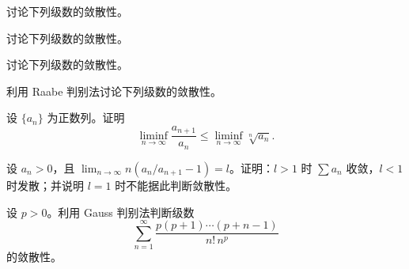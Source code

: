 \noindent\begin{minipage}{\textwidth}
讨论下列级数的敛散性。
\end{minipage}\par\vfill
\noindent\begin{minipage}{\textwidth}
讨论下列级数的敛散性。
\end{minipage}\par\vfill
\newpage
\noindent\begin{minipage}{\textwidth}
讨论下列级数的敛散性。
\end{minipage}\par\vfill
\noindent\begin{minipage}{\textwidth}
利用 Raabe 判别法讨论下列级数的敛散性。
\end{minipage}\par\vfill
\noindent\begin{minipage}{\textwidth}
设 $\{a_n\}$ 为正数列。证明\[\liminf_{n\to\infty}\frac{a_{n+1}}{a_n}\le\liminf_{n\to\infty}\sqrt[n]{a_n}.\]
\end{minipage}\par\vfill
\newpage
\noindent\begin{minipage}{\textwidth}
设 $a_n>0$，且 $\lim_{n\to\infty}n(a_n/a_{n+1}-1)=l$。证明：$l>1$ 时 $\sum a_n$ 收敛，$l<1$ 时发散；并说明 $l=1$ 时不能据此判断敛散性。
\end{minipage}\par\vfill
\noindent\begin{minipage}{\textwidth}
设 $p>0$。利用 Gauss 判别法判断级数\[\sum_{n=1}^{\infty}\frac{p(p+1)\cdots(p+n-1)}{n!\,n^p}\]的敛散性。
\end{minipage}\par\vfill
